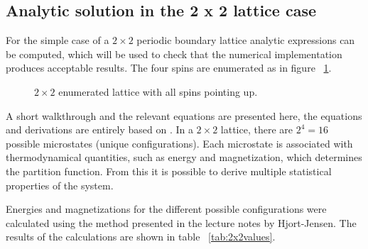 \documentclass[aps,reprint]{revtex4-1}
\begin{document}
\subsection{Analytic solution in the 2 x 2 lattice case}
For the simple case of a $2 \times 2$ periodic boundary lattice analytic
expressions can be computed, which will be used to check that the numerical
implementation produces acceptable results. The four spins are enumerated as in
figure ~\ref{fig:22lattice}.
\begin{figure}[H]
  \centering
  \caption{$2 \times 2$ enumerated lattice with all spins pointing up.}
  \label{fig:22lattice}
\end{figure}
A short walkthrough and the relevant equations are presented here, the equations
and derivations are entirely based on \cite{mortenjensen}. In a $2 \times 2$
lattice, there are $2^4 = 16$ possible microstates (unique configurations). Each
microstate is associated with thermodynamical quantities, such as energy and
magnetization, which determines the partition function. From this it is possible
to derive multiple statistical properties of the system.

Energies and magnetizations for the different possible configurations were calculated
using the method presented in the lecture notes by Hjort-Jensen.
The results of the calculations are shown in table ~\ref{tab:2x2values}.
\end{document}
